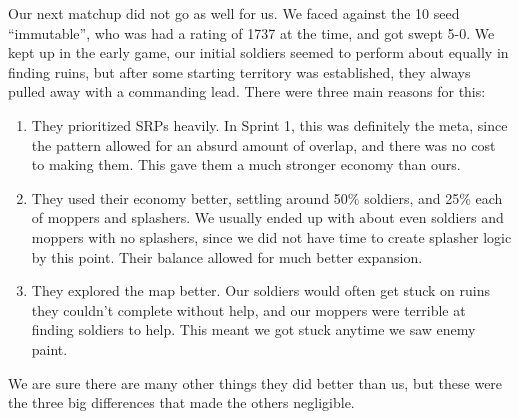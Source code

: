 Our next matchup did not go as well for us. We faced against the 10 seed ``immutable'', who was had a rating of 1737 at the time, and got swept 5-0. We kept up in the early game, our initial soldiers seemed to perform about equally in finding ruins, but after some starting territory was established, they always pulled away with a commanding lead. There were three main reasons for this:
\begin{enumerate}
  \item They prioritized SRPs heavily. In Sprint 1, this was definitely the meta, since the pattern allowed for an absurd amount of overlap, and there was no cost to making them. This gave them a much stronger economy than ours.
  \item They used their economy better, settling around 50\% soldiers, and 25\% each of moppers and splashers. We usually ended up with about even soldiers and moppers with no splashers, since we did not have time to create splasher logic by this point. Their balance allowed for much better expansion.
  \item They explored the map better. Our soldiers would often get stuck on ruins they couldn't complete without help, and our moppers were terrible at finding soldiers to help. This meant we got stuck anytime we saw enemy paint.
\end{enumerate}
We are sure there are many other things they did better than us, but these were the three big differences that made the others negligible.